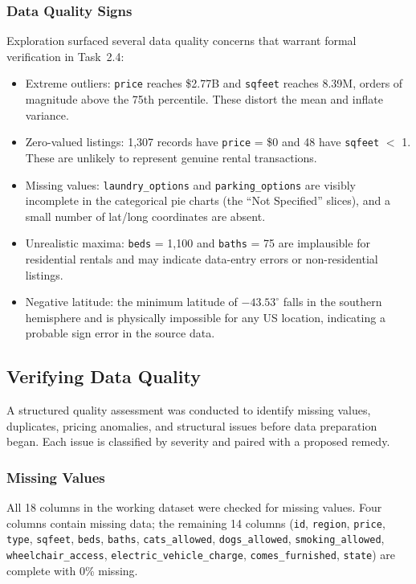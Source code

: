 \subsubsection{Data Quality Signs}
\noindent
Exploration surfaced several data quality concerns that warrant formal verification in Task~2.4:
\vspace{-9pt}
\begin{itemize}[itemsep = -9pt]
    \item Extreme outliers: \texttt{price} reaches \$2.77B and \texttt{sqfeet} reaches 8.39M, orders of magnitude above the 75th percentile. These distort the mean and inflate variance.
    \item Zero-valued listings: 1,307 records have \texttt{price} = \$0 and 48 have \texttt{sqfeet} $<$ 1. These are unlikely to represent genuine rental transactions.
    \item Missing values: \texttt{laundry\_options} and \texttt{parking\_options} are visibly incomplete in the categorical pie charts (the ``Not Specified'' slices), and a small number of lat/long coordinates are absent.
    \item Unrealistic maxima: \texttt{beds} = 1,100 and \texttt{baths} = 75 are implausible for residential rentals and may indicate data-entry errors or non-residential listings.
    \item Negative latitude: the minimum latitude of $-43.53^\circ$ falls in the southern hemisphere and is physically impossible for any US location, indicating a probable sign error in the source data.
\end{itemize}



\subsection{Verifying Data Quality}
\label{subsec:Verifying Data Quality}
\noindent
A structured quality assessment was conducted to identify missing values, duplicates, pricing anomalies, and structural issues before data preparation began. Each issue is classified by severity and paired with a proposed remedy.

\subsubsection{Missing Values}
\noindent
All 18 columns in the working dataset were checked for missing values. Four columns contain missing data; the remaining 14 columns (\texttt{id}, \texttt{region}, \texttt{price}, \texttt{type}, \texttt{sqfeet}, \texttt{beds}, \texttt{baths}, \texttt{cats\_allowed}, \texttt{dogs\_allowed}, \texttt{smoking\_allowed}, \texttt{wheelchair\_access}, \texttt{electric\_vehicle\_charge}, \texttt{comes\_furnished}, \texttt{state}) are complete with 0\% missing.

